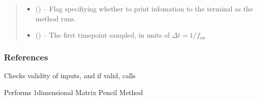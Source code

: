 \documentclass[letterpaper,10pt,english]{sphinxmanual}
\begin{document}
\begin{fulllineitems}
\begin{quote}
\begin{description}
\begin{itemize}
\item {} 
\sphinxAtStartPar
{} (\sphinxstyleliteralemphasis{\sphinxupquote{, }}) – Flag specifiying whether to print infomation to the terminal as
the method runs.

\item {} 
\sphinxAtStartPar
{} (\sphinxstyleliteralemphasis{\sphinxupquote{, }}) – The first timepoint sampled, in units of
\(\Delta t = 1 / f_{\mathrm{sw}}\)

\end{itemize}

\end{description}\end{quote}
\subsubsection*{References}

\begin{fulllineitems}
\label{\detokenize{references/mpm:nmrespy.mpm.MatrixPencil.__init__}}
\sphinxAtStartPar
Checks validity of inputs, and if valid, calls 

\end{fulllineitems}


\begin{fulllineitems}
\label{\detokenize{references/mpm:nmrespy.mpm.MatrixPencil._mpm_1d}}
\sphinxAtStartPar
Performs 1\sphinxhyphen{}dimensional Matrix Pencil Method


\end{fulllineitems}
\end{fulllineitems}
\end{document}
